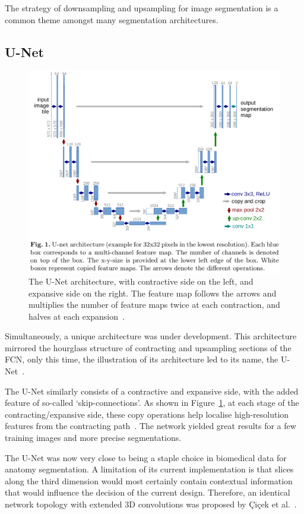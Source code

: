 \documentclass[11pt,twoside]{report}
\begin{document}
The strategy of downsampling and upsampling for image segmentation is a common theme amongst many segmentation architectures.

\subsection{U-Net}

\begin{figure}[H]
  \centering
  \includegraphics[width=.8\linewidth, trim=0 200px 0 0, clip]{../figures/u-net.png}
  \caption{The U-Net architecture, with contractive side on the left, and expansive side on the right. The feature map follows the arrows and multiplies the number of feature maps twice at each contraction, and halves at each expansion~\cite{U-Net}.}\label{fig:unet}
\end{figure}


Simultaneously, a unique architecture was under development. This architecture mirrored the hourglass structure of contracting and upsampling sections of the FCN, only this time, the illustration of its architecture led to its name, the U-Net~\cite{U-Net}.

The U-Net similarly consists of a contractive and expansive side, with the added feature of so-called `skip-connections'. As shown in Figure~\ref{fig:unet}, at each stage of the contracting/expansive side, these copy operations help localise high-resolution features from the contracting path~\cite{U-Net}. The network yielded great results for a few training images and more precise segmentations.


The U-Net was now very close to being a staple choice in biomedical data for anatomy segmentation. A limitation of its current implementation is that slices along the third dimension would most certainly contain contextual information that would influence the decision of the current design. Therefore, an identical network topology with extended 3D convolutions was proposed by \c{C}i{\c{c}}ek et al.~\cite{DBLP:journals/corr/CicekALBR16}.
\end{document}
